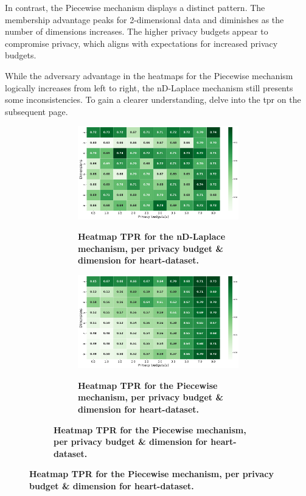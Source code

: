 In contrast, the Piecewise mechanism displays a distinct pattern. The membership advantage peaks for 2-dimensional data and diminishes as the number of dimensions increases. The higher privacy budgets appear to compromise privacy, which aligns with expectations for increased privacy budgets.

While the adversary advantage in the heatmaps for the Piecewise mechanism logically increases from left to right, the nD-Laplace mechanism still presents some inconsistencies. To gain a clearer understanding,  delve into the \gls{tpr} on the subsequent page.
\newpage
\begin{figure}[H]
  \centering
  \begin{subfigure}[b]{0.75\textwidth}
    \begin{subfigure}[c]{1\textwidth}
      \caption{\textbf{Heatmap TPR for the nD-Laplace mechanism, per privacy budget \& dimension for heart-dataset.}}
      \includegraphics[width=1\textwidth]{Results/nd-laplace/nd-Laplace/heart-dataset/tpr.png}
      \label{fig:privacy_tpr_heart-dataset_adversial_advantage_kd-laplace}
    \end{subfigure}
    \vfill %

    \begin{subfigure}[c]{1\textwidth}
      \caption{\textbf{Heatmap TPR for the Piecewise mechanism, per privacy budget \& dimension for heart-dataset.}}
      \includegraphics[width=1\textwidth]{Results/nd-laplace/piecewise/heart-dataset/tpr.png}
      \label{fig:privacy_tpr_heart-dataset_adversial_advantage_piecewise}
    \end{subfigure}
  \end{subfigure}
\end{figure}
